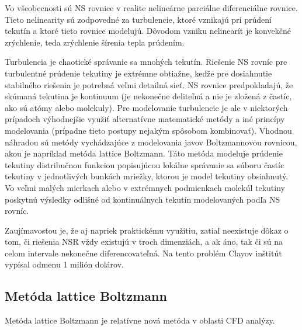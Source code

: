 \documentclass[]{tukediphc}
\begin{document}
Vo všeobecnosti sú NS rovnice v realite nelineárne parciálne diferenciálne rovnice. Tieto nelinearity sú zodpovedné za turbulencie, ktoré vznikajú pri prúdení tekutín a ktoré tieto rovnice modelujú. Dôvodom vzniku nelinearít je konvekčné zrýchlenie, teda zrýchlenie šírenia tepla prúdením. 


Turbulencia je chaotické správanie sa mnohých tekutín. Riešenie NS rovníc pre turbulentné prúdenie tekutiny je extrémne obtiažne, keďže pre dosiahnutie stabilného riešenia je potrebná veľmi detailná sieť. NS rovnice predpokladajú, že skúmaná tekutina je kontinuum (je nekonečne deliteľná a nie je zložená z častíc, ako sú atómy alebo molekuly). Pre modelovanie turbulencie je ale v niektorých prípadoch výhodnejšie využiť alternatívne matematické metódy a iné princípy modelovania (prípadne tieto postupy nejakým spôsobom kombinovať). Vhodnou náhradou sú metódy vychádzajúce z modelovania javov Boltzmannovou rovnicou, akou je napríklad metóda lattice Boltzmann. Táto metóda modeluje prúdenie tekutiny distribučnou funkciou popisujúcou lokálne správanie sa súboru častíc tekutiny v jednotlivých bunkách mriežky, ktorou je model tekutiny obsiahnutý. Vo veľmi malých mierkach alebo v extrémnych podmienkach molekúl tekutiny poskytnú výsledky odlišné od kontinuálnych tekutín modelovaných podľa NS rovníc.

Zaujímavosťou je, že aj napriek praktickému využitiu, zatiaľ neexistuje dôkaz o tom, či riešenia NSR vždy existujú v troch dimenziách, a ak áno, tak či sú na celom intervale nekonečne diferencovateľná. Na tento problém Clayov inštitút vypísal odmenu 1 milión dolárov.

\subsection{Metóda lattice Boltzmann}

Metóda lattice Boltzmann je relatívne nová metóda v oblasti CFD analýzy.
\end{document}
